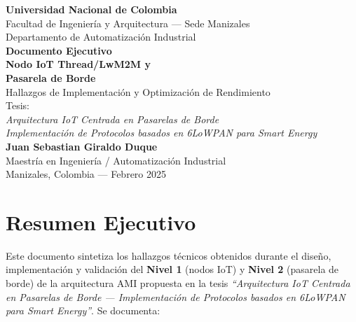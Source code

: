 \documentclass[11pt,a4paper]{article}
\begin{document}
\begin{titlepage}
\centering
\vspace*{2cm}
{\Large\bfseries Universidad Nacional de Colombia}\\[0.3cm]
{\normalsize Facultad de Ingeniería y Arquitectura — Sede Manizales}\\[0.3cm]
{\normalsize Departamento de Automatización Industrial}\\[2cm]

{\Huge\bfseries\color{unal-green} Documento Ejecutivo}\\[0.8cm]
{\LARGE\bfseries Nodo IoT Thread/LwM2M y\\Pasarela de Borde}\\[0.5cm]
{\large Hallazgos de Implementación y Optimización de Rendimiento}\\[2cm]

{\large Tesis:}\\[0.3cm]
{\Large\itshape Arquitectura IoT Centrada en Pasarelas de Borde}\\[0.2cm]
{\large\itshape Implementación de Protocolos basados en 6LoWPAN para Smart Energy}\\[2cm]

{\large\bfseries Juan Sebastian Giraldo Duque}\\[0.3cm]
{\normalsize Maestría en Ingeniería / Automatización Industrial}\\[3cm]

{\normalsize Manizales, Colombia — Febrero 2025}
\end{titlepage}

\tableofcontents
\newpage

\section{Resumen Ejecutivo}

Este documento sintetiza los hallazgos técnicos obtenidos durante el diseño, implementación y validación del \textbf{Nivel 1} (nodos IoT) y \textbf{Nivel 2} (pasarela de borde) de la arquitectura AMI propuesta en la tesis \textit{``Arquitectura IoT Centrada en Pasarelas de Borde --- Implementación de Protocolos basados en 6LoWPAN para Smart Energy''}. Se documenta:
\end{document}
